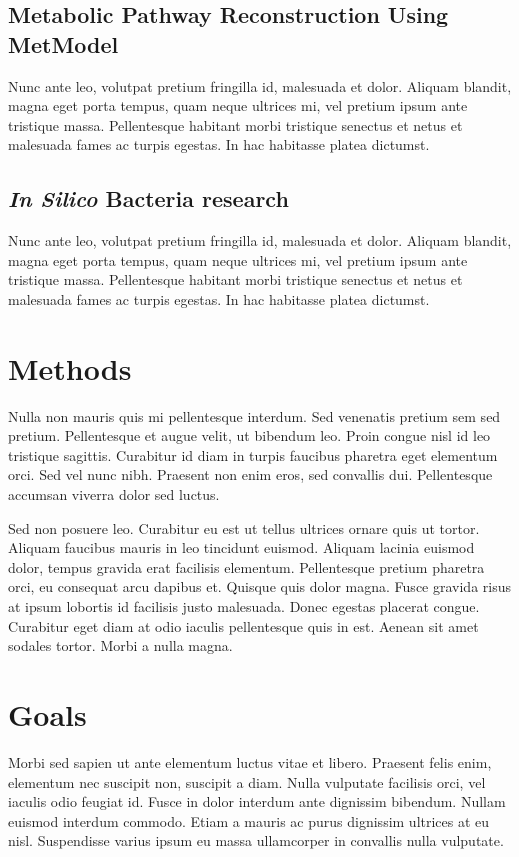 \documentclass{article}
\begin{document}
\subsection{Metabolic Pathway Reconstruction Using MetModel}

Nunc ante leo, volutpat
pretium fringilla id, malesuada et dolor. Aliquam blandit, magna eget
porta tempus, quam neque ultrices mi, vel pretium ipsum ante tristique
massa. Pellentesque habitant morbi tristique senectus et netus et
malesuada fames ac turpis egestas. In hac habitasse platea dictumst.

\subsection{\textit{In Silico} Bacteria research}

Nunc ante leo, volutpat
pretium fringilla id, malesuada et dolor. Aliquam blandit, magna eget
porta tempus, quam neque ultrices mi, vel pretium ipsum ante tristique
massa. Pellentesque habitant morbi tristique senectus et netus et
malesuada fames ac turpis egestas. In hac habitasse platea dictumst.

\section{Methods}
Nulla non mauris quis mi pellentesque interdum. Sed venenatis pretium
sem sed pretium. Pellentesque \citep{berard1994embedding} et augue velit, ut bibendum leo. Proin
congue nisl id leo tristique sagittis. Curabitur id diam in turpis
faucibus pharetra eget elementum orci. Sed vel nunc nibh. Praesent non
enim eros, sed convallis dui. Pellentesque accumsan viverra dolor sed
luctus.

Sed non posuere leo. Curabitur eu est ut tellus ultrices ornare quis
ut tortor. Aliquam faucibus mauris in leo tincidunt euismod. Aliquam
lacinia euismod dolor, tempus gravida erat facilisis elementum.
Pellentesque pretium pharetra orci, eu consequat arcu dapibus et.
Quisque quis dolor magna. Fusce gravida risus at ipsum lobortis id
facilisis justo malesuada. Donec egestas placerat congue. Curabitur
eget diam at odio iaculis pellentesque quis in est. Aenean sit amet
sodales tortor. Morbi a nulla magna.

\section{Goals}
Morbi sed sapien ut ante elementum \citep{belkin2002using} luctus vitae et libero. Praesent
felis enim, elementum nec suscipit non, suscipit a diam. Nulla
vulputate facilisis orci, vel iaculis odio feugiat id. Fusce in dolor
interdum ante dignissim bibendum. Nullam euismod interdum commodo.
Etiam a mauris ac purus dignissim ultrices at eu nisl. Suspendisse
varius ipsum eu massa ullamcorper in convallis nulla vulputate.
\end{document}
